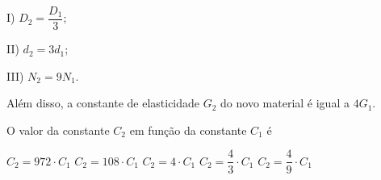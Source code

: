I) \( D_2 = \dfrac{D_1}{3} \);

II) \( d_2 = 3d_1 \);

III) \( N_2 = 9N_1 \).

Além disso, a constante de elasticidade \( G_2 \) do novo material é igual a \( 4G_1 \).

O valor da constante \( C_2 \) em função da constante \( C_1 \) é
\begin{choices}
\correctchoice \( C_2 = 972 \cdot C_1 \)
\choice \( C_2 = 108 \cdot C_1 \)
\choice \( C_2 = 4 \cdot C_1 \)
\choice \( C_2 = \dfrac{4}{3} \cdot C_1 \)
\choice \( C_2 = \dfrac{4}{9} \cdot C_1 \)
\end{choices}
